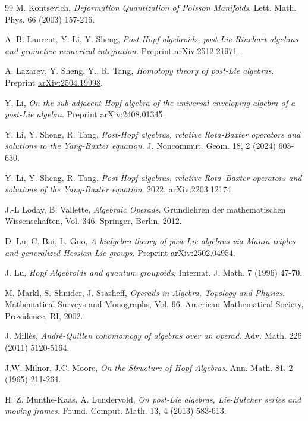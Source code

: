 \documentclass[10pt]{article}
\theoremstyle{definition}
\begin{document}
\begin{thebibliography}{99}
M. Kontsevich, \emph{Deformation Quantization of Poisson Manifolds}. Lett. Math. Phys. 66 (2003) 157-216.

A. B. Laurent, Y. Li, Y. Sheng, \emph{Post-Hopf algebroids, post-Lie-Rinehart algebras and geometric numerical integration}. Preprint \hyperlink{https://arxiv.org/abs/2512.21971}{arXiv:2512.21971}.

 A. Lazarev, Y. Sheng, Y., R. Tang,
\emph{Homotopy theory of post-Lie algebras}. Preprint \hyperlink{https://arxiv.org/abs/2504.19998}{arXiv:2504.19998}.

Y, Li,
\emph{On the sub-adjacent Hopf algebra of the universal enveloping algebra of a post-Lie algebra}. Preprint \hyperlink{https://arxiv.org/abs/2408.01345}{arXiv:2408.01345}.

Y. Li, Y. Sheng, R. Tang, 
\emph{Post-Hopf algebras, relative Rota-Baxter operators and solutions to the Yang-Baxter equation}. J. Noncommut. Geom. 18, 2 (2024) 605-630.

Y. Li, Y. Sheng, R. Tang,
\emph{Post-Hopf algebras, relative Rota--Baxter operators and solutions of the Yang-Baxter equation}. 2022, arXiv:2203.12174.

J.-L Loday, B. Vallette, \emph{Algebraic Operads}. Grundlehren der mathematischen Wissenschaften, Vol. 346. Springer, Berlin, 2012.%

 D. Lu, C. Bai, L. Guo,
\emph{A bialgebra theory of post-Lie algebras via Manin triples and generalized Hessian Lie groups}. Preprint \hyperlink{https://arxiv.org/abs/2502.04954}{arXiv:2502.04954}.

J. Lu, 
\emph{Hopf Algebroids and quantum groupoids}, Internat. J. Math. 7 (1996) 47-70.

 M. Markl, S. Shnider, J. Stasheff, \emph{Operads in Algebra, Topology and Physics.}
Mathematical Surveys and Monographs, Vol. 96. American Mathematical Society, Providence, RI,
2002. %

 J. Mill\`es, \emph{Andr\'e-Quillen cohomomogy of algebras over an operad.} Adv. Math. 226 (2011) 5120-5164.

J.W. Milnor, J.C. Moore,
\emph{On the Structure of Hopf Algebras}.
Ann. Math. 81, 2 (1965) 211-264.

H. Z. Munthe-Kaas, A. Lundervold,
\emph{On post-Lie algebras, Lie-Butcher series and moving frames}. Found. Comput. Math. 13, 4 (2013) 583-613.



\end{thebibliography}
\end{document}
